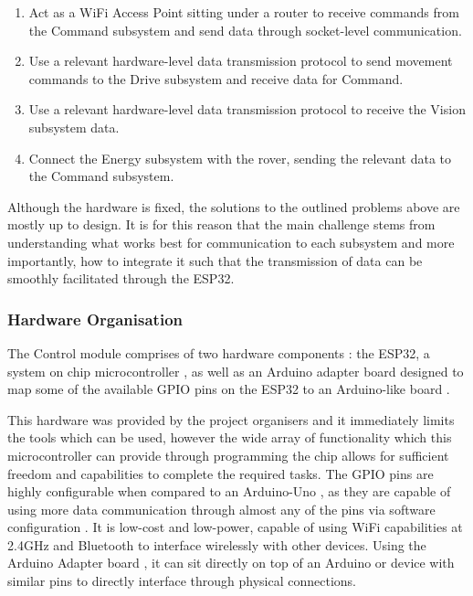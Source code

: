 \documentclass[a4paper]{article}
\begin{document}
\begin{enumerate}
    \item Act as a WiFi Access Point sitting under a router to receive
    commands from the Command subsystem and send data through socket-level communication.
    \item Use a relevant hardware-level data transmission protocol to
    send movement commands to the Drive subsystem and receive data for Command. 
    \item Use a relevant hardware-level data transmission protocol to receive
    the Vision subsystem data.
    \item Connect the Energy subsystem with the rover, sending the relevant data
    to the Command subsystem.
\end{enumerate}

Although the hardware is fixed, the solutions to the outlined problems
above are mostly up to design. It is for this reason that the main challenge
stems from understanding what works best for communication to each subsystem
and more importantly, how to integrate it such that the transmission of data
can be smoothly facilitated through the ESP32.

\subsubsection{Hardware Organisation}

The Control module comprises of two hardware components \cite{BoxContent}: 
the ESP32, a system on chip microcontroller \cite{ESP32Datasheet}, as well as an Arduino adapter
board designed to map some of the available GPIO pins on the ESP32 to an Arduino-like
board \cite{ESP32ArduinoAdapter}.

This hardware was provided by the project organisers and it immediately limits
the tools which can be used, however the wide array of functionality which
this microcontroller can provide through programming the chip allows
for sufficient freedom and capabilities to complete the required tasks. The
GPIO pins are highly configurable when compared to an Arduino-Uno \cite{MicrocontrollerComparison}, as they
are capable of using more data communication through almost any of the pins
via software configuration \cite{ESP32PinOut}. It is low-cost and low-power, 
capable of using WiFi capabilities at 2.4GHz and Bluetooth \cite{ESP32Datasheet} to interface wirelessly
with other devices. Using the Arduino Adapter board \cite{ESP32ArduinoAdapter}, it can sit directly on top of
an Arduino or device with similar pins to directly interface through physical connections. 
\end{document}
